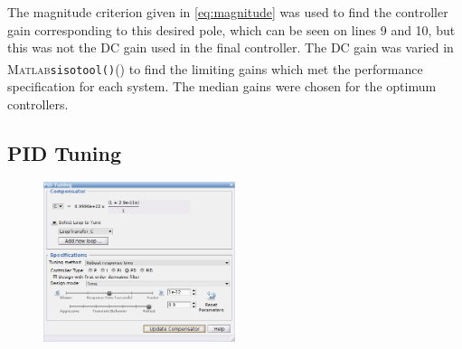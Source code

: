 \documentclass[a4paper,10pt,twocolumn]{article}
\newcommand{\Matlab}{\textsc{Matlab}\textsuperscript{\textregistered}\xspace}
\newcommand{\sisotool}{\texttt{sisotool()}\xspace}
\begin{document}
The magnitude criterion given in \eqref{eq:magnitude} was used to find the controller gain corresponding to this desired pole, which can be seen on lines 9 and 10, but this was not the DC gain used in the final controller. The DC gain was varied in \Matlab \sisotool() to find the limiting gains which met the performance specification for each system. The median gains were chosen for the optimum controllers.

\subsection{PID Tuning}

\begin{figure}[h]
	\centering
	\includegraphics[width=0.5\textwidth]{img/pid_tune.png}
	\caption{}
	\label{fig:pid_tune}
\end{figure}
\end{document}
